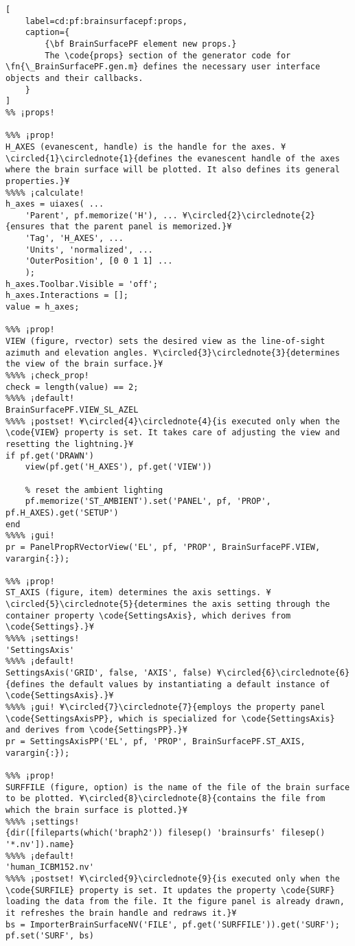 \documentclass{tufte-handout}
\begin{document}
\begin{lstlisting}[
	label=cd:pf:brainsurfacepf:props,
	caption={
		{\bf BrainSurfacePF element new props.}
		The \code{props} section of the generator code for \fn{\_BrainSurfacePF.gen.m} defines the necessary user interface objects and their callbacks.
	}
]
%% ¡props!

%%% ¡prop!
H_AXES (evanescent, handle) is the handle for the axes. ¥\circled{1}\circlednote{1}{defines the evanescent handle of the axes where the brain surface will be plotted. It also defines its general properties.}¥
%%%% ¡calculate!
h_axes = uiaxes( ...
    'Parent', pf.memorize('H'), ... ¥\circled{2}\circlednote{2}{ensures that the parent panel is memorized.}¥
    'Tag', 'H_AXES', ...
    'Units', 'normalized', ...
    'OuterPosition', [0 0 1 1] ...
    );
h_axes.Toolbar.Visible = 'off';
h_axes.Interactions = [];
value = h_axes;

%%% ¡prop!
VIEW (figure, rvector) sets the desired view as the line-of-sight azimuth and elevation angles. ¥\circled{3}\circlednote{3}{determines the view of the brain surface.}¥
%%%% ¡check_prop!
check = length(value) == 2;
%%%% ¡default!
BrainSurfacePF.VIEW_SL_AZEL
%%%% ¡postset! ¥\circled{4}\circlednote{4}{is executed only when the \code{VIEW} property is set. It takes care of adjusting the view and resetting the lightning.}¥
if pf.get('DRAWN')
    view(pf.get('H_AXES'), pf.get('VIEW'))
    
    % reset the ambient lighting
    pf.memorize('ST_AMBIENT').set('PANEL', pf, 'PROP', pf.H_AXES).get('SETUP')
end
%%%% ¡gui!
pr = PanelPropRVectorView('EL', pf, 'PROP', BrainSurfacePF.VIEW, varargin{:});

%%% ¡prop!
ST_AXIS (figure, item) determines the axis settings. ¥\circled{5}\circlednote{5}{determines the axis setting through the container property \code{SettingsAxis}, which derives from \code{Settings}.}¥
%%%% ¡settings!
'SettingsAxis'
%%%% ¡default!
SettingsAxis('GRID', false, 'AXIS', false) ¥\circled{6}\circlednote{6}{defines the default values by instantiating a default instance of \code{SettingsAxis}.}¥
%%%% ¡gui! ¥\circled{7}\circlednote{7}{employs the property panel \code{SettingsAxisPP}, which is specialized for \code{SettingsAxis} and derives from \code{SettingsPP}.}¥
pr = SettingsAxisPP('EL', pf, 'PROP', BrainSurfacePF.ST_AXIS, varargin{:});

%%% ¡prop!
SURFFILE (figure, option) is the name of the file of the brain surface to be plotted. ¥\circled{8}\circlednote{8}{contains the file from which the brain surface is plotted.}¥
%%%% ¡settings!
{dir([fileparts(which('braph2')) filesep() 'brainsurfs' filesep() '*.nv']).name}
%%%% ¡default!
'human_ICBM152.nv'
%%%% ¡postset! ¥\circled{9}\circlednote{9}{is executed only when the \code{SURFILE} property is set. It updates the property \code{SURF} loading the data from the file. It the figure panel is already drawn, it refreshes the brain handle and redraws it.}¥
bs = ImporterBrainSurfaceNV('FILE', pf.get('SURFFILE')).get('SURF');
pf.set('SURF', bs)


\end{lstlisting}
\end{document}
